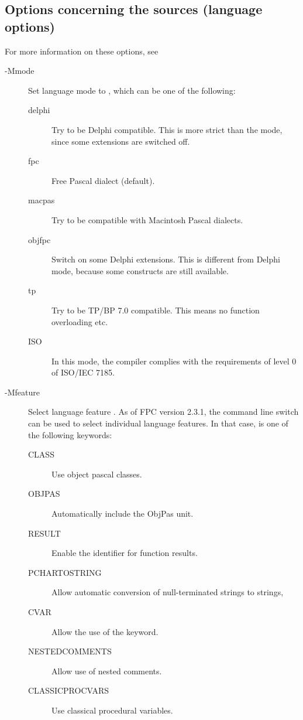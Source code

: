 %
%


\subsection{Options concerning the sources (language options)}
\label{se:sourceoptions}
For more information on these options, see \progref
\begin{description}
\item[-Mmode]  Set language mode to , which can be one of the
following:
\begin{description}
\item[delphi] Try to be Delphi compatible. This is more strict
than the  mode, since some \fpc extensions are switched off.
\item[fpc] Free Pascal dialect (default).
\item[macpas] Try to be compatible with Macintosh Pascal dialects.
\item[objfpc] Switch on some Delphi extensions. This is different from
Delphi mode, because some \fpc constructs are still available.
\item[tp] Try to be TP/BP 7.0 compatible. This means no function overloading
etc.
\item[ISO] In this mode, the compiler complies with the requirements of level
0 of ISO/IEC 7185.
\end{description}
\item[-Mfeature]  Select language feature .
As of FPC version 2.3.1, the  command line switch can be used to select individual
language features. In that case,  is one of the following keywords:
\begin{description}
\item[CLASS] Use object pascal classes.
\item[OBJPAS] Automatically include the ObjPas unit.
\item[RESULT] Enable the  identifier for function results.
\item[PCHARTOSTRING] Allow automatic conversion of null-terminated strings
to strings,
\item[CVAR] Allow the use of the  keyword.
\item[NESTEDCOMMENTS] Allow use of nested comments.
\item[CLASSICPROCVARS] Use classical procedural variables.

\end{description}
\end{description}
